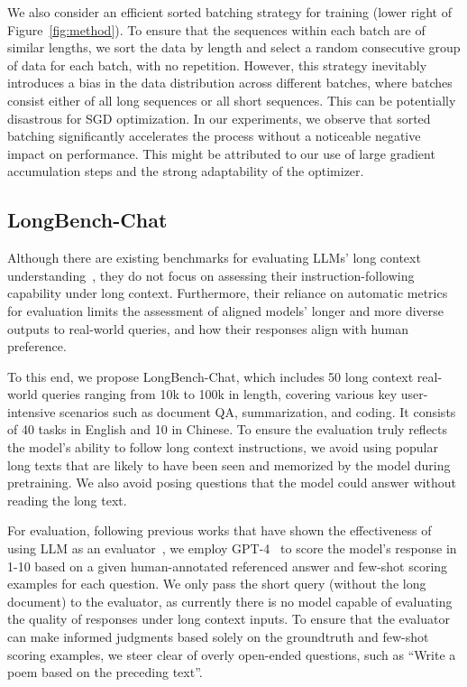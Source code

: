 We also consider an efficient sorted batching strategy for training (lower right of Figure~\ref{fig:method}). To ensure that the sequences within each batch are of similar lengths, we sort the data by length and select a random consecutive group of data for each batch, with no repetition.
However, this strategy inevitably introduces a bias in the data distribution across different batches, where batches consist either of all long sequences or all short sequences. 
This can be potentially disastrous for SGD optimization.
In our experiments, we observe that sorted batching significantly accelerates the process without a noticeable negative impact on performance. This might be attributed to our use of large gradient accumulation steps and the strong adaptability of the optimizer.

\subsection{LongBench-Chat}
Although there are existing benchmarks for evaluating LLMs' long context understanding~\cite{an2023leval,bai2023longbench,li2023loogle}, they do not focus on assessing their instruction-following capability under long context. Furthermore, their reliance on automatic metrics for evaluation limits the assessment of aligned models' longer and more diverse outputs to real-world queries, and how their responses align with human preference.

To this end, we propose LongBench-Chat, which includes 50 long context real-world queries ranging from 10k to 100k in length, covering various key user-intensive scenarios such as document QA, summarization, and coding. It consists of 40 tasks in English and 10 in Chinese. 
To ensure the evaluation truly reflects the model's ability to follow long context instructions, we avoid using popular long texts that are likely to have been seen and memorized by the model during pretraining. 
We also avoid posing questions that the model could answer without reading the long text. 

For evaluation, following previous works that have shown the effectiveness of using LLM as an evaluator~\cite{bai2023benchmarking,zheng2023judging,ke2023critiquellm}, we employ GPT-4~\cite{GPT-4} to score the model's response in 1-10 based on a given human-annotated referenced answer and few-shot scoring examples for each question.
We only pass the short query (without the long document) to the evaluator, as currently there is no model capable of evaluating the quality of responses under long context inputs.
To ensure that the evaluator can make informed judgments based solely on the groundtruth and few-shot scoring examples, we steer clear of overly open-ended questions, such as ``Write a poem based on the preceding text''.

